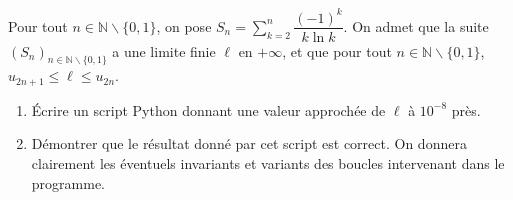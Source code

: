 \exer{}
\setcounter{numques}{0}

Pour tout $n\in \mathbb{N}\backslash\{0,1\}$, on pose $S_n=\displaystyle\sum_{k=2}^n 
\dfrac{(-1)^k}{k\ln k}$. On admet que la suite $\left(S_n\right)_{n\in\mathbb{N}\backslash\{0,1\}}$ a 
une limite finie $\ell$ en $+\infty$, et que pour tout $n\in\mathbb{N}\backslash\{0,1\}$, $u_{2n+1}\leq \ell\leq u_{2n}$.

\begin{enumerate}
\item Écrire un script Python donnant une valeur approchée de $\ell$ à $10^{-8}$ près.
\item Démontrer que le résultat donné par cet script est correct. On donnera clairement les éventuels invariants et variants des boucles intervenant dans 
le programme.
\end{enumerate}